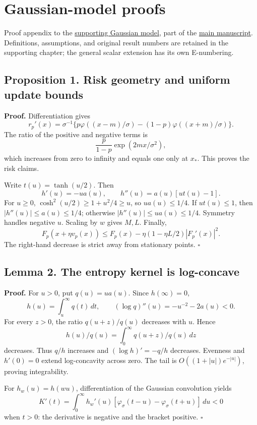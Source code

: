 \section{Gaussian-model proofs}\label{gaussian_proofs-gaussian-model-proofs}

Proof appendix to the \href{gaussian_model.md}{supporting Gaussian
model}, part of the \href{DRAFT.md}{main manuscript}. Definitions,
assumptions, and original result numbers are retained in the supporting
chapter; the general scalar extension has its own E-numbering.

\subsection{Proposition 1. Risk geometry and uniform update
bounds}\label{gaussian_proofs-proposition-1.-risk-geometry-and-uniform-update-bounds}

\textbf{Proof.} Differentiation gives \[
r_p'(x)=\sigma^{-1}
\{p\varphi((x-m)/\sigma)-(1-p)\varphi((x+m)/\sigma)\}.
\] The ratio of the positive and negative terms is \[
\frac{p}{1-p}\exp(2mx/\sigma^2),
\] which increases from zero to infinity and equals one only at \(x_*\).
This proves the risk claims.

Write \(t(u)=\tanh(u/2)\). Then \[
h'(u)=-ua(u),\qquad h''(u)=a(u)[ut(u)-1].
\] For \(u\ge0\), \(\cosh^2(u/2)\ge1+u^2/4\ge u\), so \(ua(u)\le1/4\).
If \(ut(u)\le1\), then \(|h''(u)|\le a(u)\le1/4\); otherwise
\(|h''(u)|\le ua(u)\le1/4\). Symmetry handles negative \(u\). Scaling by
\(w\) gives \(M,L\). Finally, \[
F_p(x+\eta v_p(x))
\le F_p(x)-\eta(1-\eta L/2)|F_p'(x)|^2.
\] The right-hand decrease is strict away from stationary points.
\(\square\)

\subsection{Lemma 2. The entropy kernel is
log-concave}\label{gaussian_proofs-lemma-2.-the-entropy-kernel-is-log-concave}

\textbf{Proof.} For \(u>0\), put \(q(u)=ua(u)\). Since \(h(\infty)=0\),
\[
h(u)=\int_u^\infty q(t)\,dt,\qquad
(\log q)''(u)=-u^{-2}-2a(u)<0.
\] For every \(z>0\), the ratio \(q(u+z)/q(u)\) decreases with \(u\).
Hence \[
h(u)/q(u)=\int_0^\infty q(u+z)/q(u)\,dz
\] decreases. Thus \(q/h\) increases and \((\log h)'=-q/h\) decreases.
Evenness and \(h'(0)=0\) extend log-concavity across zero. The tail is
\(O((1+|u|)e^{-|u|})\), proving integrability.

For \(h_w(u)=h(wu)\), differentiation of the Gaussian convolution yields
\[
K'(t)=\int_0^\infty h_w'(u)
[\varphi_\sigma(t-u)-\varphi_\sigma(t+u)]\,du<0
\] when \(t>0\): the derivative is negative and the bracket positive.
\(\square\)

